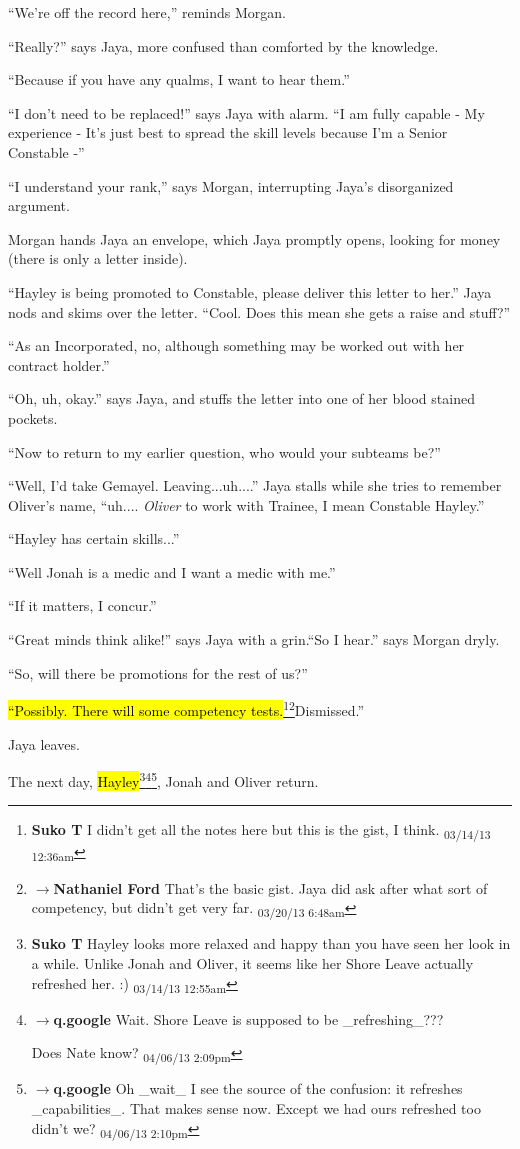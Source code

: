 ``We're off the record here,'' reminds Morgan.

``Really?'' says Jaya, more confused than comforted by the knowledge.

``Because if you have any qualms, I want to hear them.''

``I don't need to be replaced!'' says Jaya with alarm. ``I am fully capable - My experience - It's just best to spread the skill levels because I'm a Senior Constable -''

``I understand your rank,'' says Morgan, interrupting Jaya's disorganized argument.

Morgan hands Jaya an envelope, which Jaya promptly opens, looking for money (there is only a letter inside).

``Hayley is being promoted to Constable, please deliver this letter to her.''  Jaya nods and skims over the letter.  ``Cool.  Does this mean she gets a raise and stuff?''

``As an Incorporated, no, although something may be worked out with her contract holder.''

``Oh, uh, okay.'' says Jaya, and stuffs the letter into one of her blood stained pockets.

``Now to return to my earlier question, who would your subteams be?''

``Well, I'd take Gemayel.  Leaving...uh....'' Jaya stalls while she tries to remember Oliver's name, ``uh.... \textit{Oliver }to work with Trainee, I mean Constable Hayley.''

``Hayley has certain skills...''

``Well Jonah is a medic and I want a medic with me.''

``If it matters, I concur.''

``Great minds think alike!'' says Jaya with a grin.``So I hear.'' says Morgan dryly.

``So, will there be promotions for the rest of us?''

\hl{``Possibly. There will some competency tests.}\footnote{\textbf{Suko T }I didn't get all the notes here but this is the gist, I think. \textsubscript{03/14/13 12:36am}}\footnote{$\rightarrow$\textbf{Nathaniel Ford }That's the basic gist. Jaya did ask after what sort of competency, but didn't get very far. \textsubscript{03/20/13 6:48am}}Dismissed.''

Jaya leaves.



The next day, \hl{Hayley}\footnote{\textbf{Suko T }Hayley looks more relaxed and happy than you have seen her look in a while.  Unlike Jonah and Oliver, it seems like her Shore Leave actually refreshed her. :) \textsubscript{03/14/13 12:55am}}\footnote{$\rightarrow$\textbf{q.google }Wait.  Shore Leave is supposed to be \_refreshing\_???

Does Nate know? \textsubscript{04/06/13 2:09pm}}\footnote{$\rightarrow$\textbf{q.google }Oh \_wait\_ I see the source of the confusion: it refreshes \_capabilities\_.  That makes sense now.  Except we had ours refreshed too didn't we?
 \textsubscript{04/06/13 2:10pm}}, Jonah and Oliver return.  



